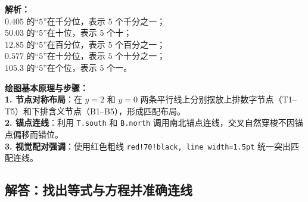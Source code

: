 \vspace{0.6cm}

{\small\color{gray}
\textbf{解析：}\\
$0.405$ 的“$5$”在千分位，表示 $5$ 个千分之一；\\
$50.03$ 的“$5$”在十位，表示 $5$ 个十；\\
$12.85$ 的“$5$”在百分位，表示 $5$ 个百分之一；\\
$0.577$ 的“$5$”在十分位，表示 $5$ 个十分之一；\\
$105.3$ 的“$5$”在个位，表示 $5$ 个一。
}

\vspace{0.6cm}

{\small\color{blue!70!black}
\textbf{绘图基本原理与步骤：}\\
\textbf{1. 节点对称布局}：在 $y=2$ 和 $y=0$ 两条平行线上分别摆放上排数字节点（T1--T5）和下排含义节点（B1--B5），形成匹配布局。\\
\textbf{2. 锚点连线}：利用 \texttt{T.south} 和 \texttt{B.north} 调用南北锚点连线，交叉自然穿梭不因锚点偏移而错位。\\
\textbf{3. 视觉配对强调}：使用红色粗线 \texttt{red!70!black, line width=1.5pt} 统一突出匹配连线。
}

\newpage

\newpage

\subsection{解答：找出等式与方程并准确连线}

\vspace{0.6cm}

